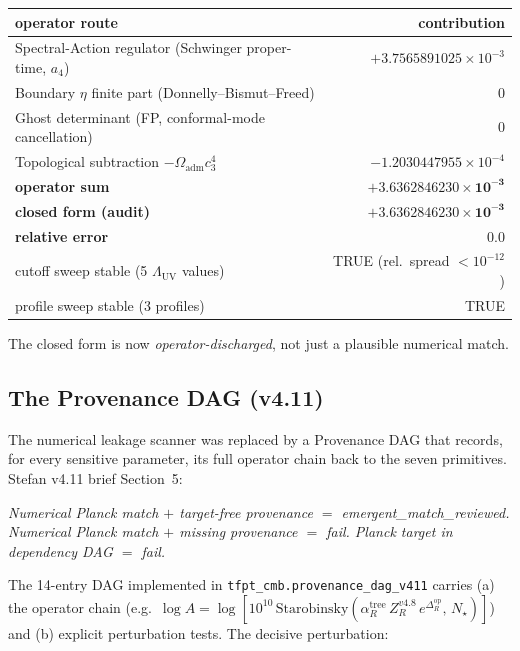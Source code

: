 \documentclass[11pt,a4paper]{article}
\begin{document}
\begin{center}
\renewcommand{\arraystretch}{1.15}
\begin{tabular}{lr}\hline\hline
operator route & contribution \\\hline
Spectral-Action regulator (Schwinger proper-time, \(a_4\)) & \(+3.7565891025\times 10^{-3}\) \\
Boundary \(\eta\) finite part (Donnelly--Bismut--Freed)     & \(0\) \\
Ghost determinant (FP, conformal-mode cancellation)         & \(0\) \\
Topological subtraction \(-\Omega_{\mathrm{adm}}c_3^4\)     & \(-1.2030447955\times 10^{-4}\) \\\hline
\textbf{operator sum}                                        & \(\boldsymbol{+3.6362846230\times 10^{-3}}\) \\
\textbf{closed form (audit)}                                 & \(\boldsymbol{+3.6362846230\times 10^{-3}}\) \\
\textbf{relative error}                                      & \(\boldsymbol{0.0}\) \\\hline
cutoff sweep stable (5 \(\Lambda_{\mathrm{UV}}\) values)     & TRUE (rel.\ spread \(<10^{-12}\)) \\
profile sweep stable (3 profiles)                            & TRUE \\\hline
\end{tabular}
\end{center}

The closed form is now \emph{operator-discharged}, not just a
plausible numerical match.

\subsection{The Provenance DAG (v4.11)}
\label{sec:v412_provenance}

The numerical leakage scanner was replaced by a Provenance DAG that
records, for every sensitive parameter, its full operator chain back
to the seven primitives.  Stefan v4.11 brief Section~5:

\emph{Numerical Planck match \(+\) target-free provenance \(=\)
emergent\_match\_reviewed.  Numerical Planck match \(+\) missing
provenance \(=\) fail.  Planck target in dependency DAG \(=\) fail.}

The 14-entry DAG implemented in
\texttt{tfpt\_cmb.provenance\_dag\_v411} carries (a) the operator
chain (e.g.\ \(\log A=\log[10^{10}\,\mathrm{Starobinsky}(\alpha_R^{\mathrm{tree}}\,
Z_R^{v4.8}\,e^{\Delta_R^{\mathrm{op}}},\,N_\star)]\)) and (b)
explicit perturbation tests.  The decisive perturbation:
\end{document}
